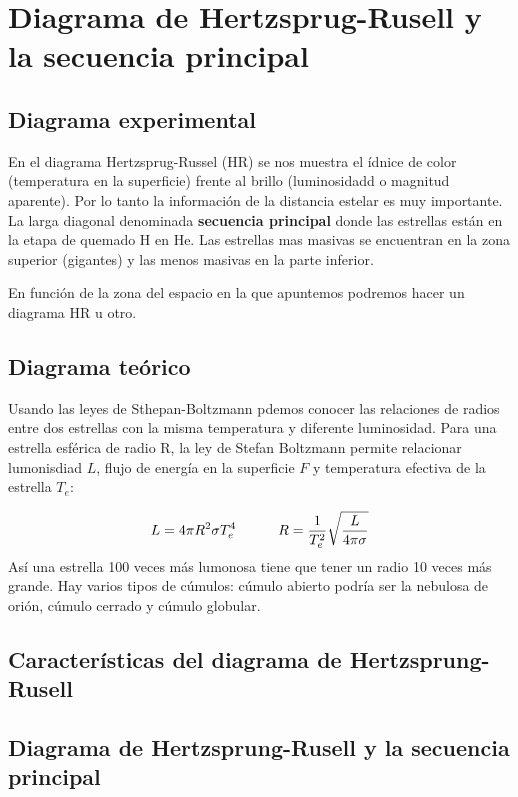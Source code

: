 \section{Diagrama de Hertzsprug-Rusell y la secuencia principal}

\subsection{Diagrama experimental}

En el diagrama Hertzsprug-Russel (HR) se nos muestra el ídnice de color (temperatura en la superficie) frente al brillo (luminosidadd o magnitud aparente). Por lo tanto la información de la distancia estelar es muy importante. La larga diagonal denominada \textbf{secuencia principal} donde las estrellas están en la etapa de quemado H en He. Las estrellas mas masivas se encuentran en la zona superior (gigantes) y las menos masivas en la parte inferior. 

En función de la zona del espacio en la que apuntemos podremos hacer un diagrama HR u otro. 

\subsection{Diagrama teórico}


Usando las leyes de Sthepan-Boltzmann pdemos conocer las relaciones de radios entre dos estrellas con la misma temperatura y diferente luminosidad. Para una estrella esférica de radio R, la ley de Stefan Boltzmann permite relacionar lumonisdiad $L$, flujo de energía en la superficie $F$ y temperatura efectiva de la estrella $T_e$:

\begin{equation}
    L = 4\pi R^2 \sigma T_e^4 \quad \quad \quad R = \frac{1}{T_e^2} \sqrt{\frac{L}{4\pi \sigma}}
\end{equation}
Así una estrella 100 veces más lumonosa tiene que tener un radio 10 veces más grande. Hay  varios tipos de cúmulos: cúmulo abierto podría ser la nebulosa de orión, cúmulo cerrado y cúmulo globular.

\subsection{Características del diagrama de Hertzsprung-Rusell}



\subsection{Diagrama de Hertzsprung-Rusell y la secuencia principal}

